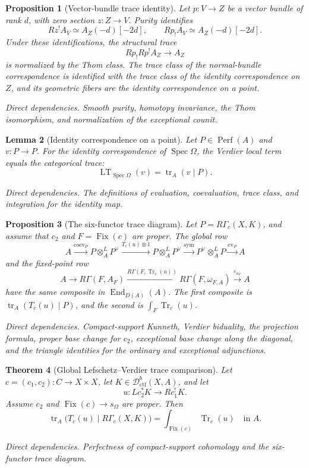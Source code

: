 \documentclass[10pt]{article}
\newtheorem{theorem}{Theorem}[section]
\newtheorem{proposition}[theorem]{Proposition}
\newtheorem{lemma}[theorem]{Lemma}
\theoremstyle{definition}
\newcommand{\Dctf}{\mathcal D^b_{\mathrm{ctf}}}
\newcommand{\Perf}{\operatorname{Perf}}
\newcommand{\Spec}{\operatorname{Spec}}
\newcommand{\Fix}{\operatorname{Fix}}
\newcommand{\End}{\operatorname{End}}
\newcommand{\RGammac}{R\Gamma_c}
\newcommand{\depends}[1]{\par\smallskip\noindent\textit{Direct dependencies.} #1\par}
\begin{document}
\begin{proposition}[Vector-bundle trace identity]
Let \(p:V\to Z\) be a vector bundle of rank \(d\), with zero section
\(z:Z\to V\).  Purity identifies
\[
 Rz^!A_V\simeq A_Z(-d)[-2d],
\qquad
 Rp_!A_V\simeq A_Z(-d)[-2d].
\]
Under these identifications, the structural trace
\[
 Rp_!Rp^!A_Z\longrightarrow A_Z
\]
is normalized by the Thom class.  The trace class of the normal-bundle
correspondence is identified with the trace class of the identity
correspondence on \(Z\), and its geometric fibers are the identity
correspondence on a point.
\depends{Smooth purity, homotopy invariance, the Thom isomorphism, and
normalization of the exceptional counit.}
\end{proposition}

\begin{lemma}[Identity correspondence on a point]
Let \(P\in\Perf(A)\) and \(v:P\to P\).  For the identity correspondence of
\(\Spec\Omega\), the Verdier local term equals the categorical trace:
\[
 \operatorname{LT}_{\Spec\Omega}(v)=\operatorname{tr}_A(v\mid P).
\]
\depends{The definitions of evaluation, coevaluation, trace class, and
integration for the identity map.}
\end{lemma}

\begin{proposition}[The six-functor trace diagram]
Let \(P=\RGammac(X,K)\), and assume that \(c_2\) and
\(F=\Fix(c)\) are proper.  The global row
\[
 A\xrightarrow{\operatorname{coev}_P}P\otimes_A^LP^\vee
 \xrightarrow{T_c(u)\otimes1}P\otimes_A^LP^\vee
 \xrightarrow{\mathrm{sym}}P^\vee\otimes_A^LP
 \xrightarrow{\operatorname{ev}_P}A
\]
and the fixed-point row
\[
 A\longrightarrow R\Gamma(F,A_F)
 \xrightarrow{R\Gamma(F,\operatorname{Tr}_c(u))}
 R\Gamma(F,\omega_{F,A})
 \xrightarrow{\varepsilon_{a_F}}A
\]
have the same composite in \(\End_{D(A)}(A)\).  The first composite is
\(\operatorname{tr}_A(T_c(u)\mid P)\), and the second is
\(\int_F\operatorname{Tr}_c(u)\).
\depends{Compact-support Kunneth, Verdier biduality, the projection formula,
proper base change for \(c_2\), exceptional base change along the diagonal,
and the triangle identities for the ordinary and exceptional adjunctions.}
\end{proposition}

\begin{theorem}[Global Lefschetz--Verdier trace comparison]
Let \(c=(c_1,c_2):C\to X\times X\), let
\(K\in\Dctf(X,A)\), and let
\[
 u:Lc_2^*K\longrightarrow Rc_1^!K.
\]
Assume \(c_2\) and \(\Fix(c)\to s_\Omega\) are proper.  Then
\[
 \operatorname{tr}_A
 \bigl(T_c(u)\mid\RGammac(X,K)\bigr)
 =
 \int_{\Fix(c)}\operatorname{Tr}_c(u)
 \quad\text{in }A.
\]
\depends{Perfectness of compact-support cohomology and the six-functor trace
diagram.}
\end{theorem}
\end{document}
